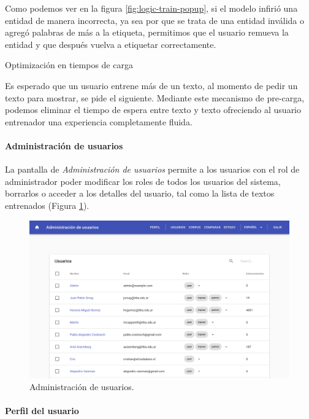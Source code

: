 \documentclass[12pt,a4paper,]{scrartcl}
\let\oldparagraph\paragraph
\renewcommand{\paragraph}[1]{\oldparagraph{#1}\mbox{}}
\begin{document}
Como podemos ver en la figura \ref{fig:logic-train-popup}, si el modelo infirió una entidad de manera incorrecta, ya sea por que se trata de una entidad inválida o agregó palabras de más a la etiqueta, permitimos que el usuario remueva la entidad y que después vuelva a etiquetar correctamente.

Optimización en tiempos de carga

Es esperado que un usuario entrene más de un texto, al momento de pedir un texto para mostrar, se pide el siguiente. Mediante este mecanismo de pre-carga, podemos eliminar el tiempo de espera entre texto y texto ofreciendo al usuario entrenador una experiencia completamente fluida.

\hypertarget{administraciuxf3n-de-usuarios}{%
\paragraph{Administración de usuarios}\label{administraciuxf3n-de-usuarios}}

La pantalla de \emph{Administración de usuarios} permite a los usuarios con el rol de administrador poder modificar los roles de todos los usuarios del sistema, borrarlos o acceder a los detalles del usuario, tal como la lista de textos entrenados (Figura \ref{fig:logic-user-list}).

\begin{figure}[H]

{\centering \includegraphics{assets/logic/user-list.pdf} 

}

\caption{Administración de usuarios.}\label{fig:logic-user-list}
\end{figure}

\hypertarget{perfil-del-usuario}{%
\paragraph{Perfil del usuario}\label{perfil-del-usuario}}
\end{document}
